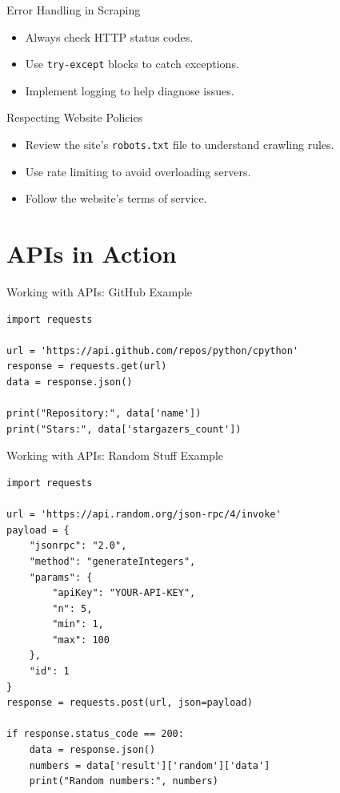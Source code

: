 \documentclass[10pt]{beamer}
\begin{document}
\begin{frame}[fragile]{Error Handling in Scraping}
    \begin{itemize}
        \item Always check HTTP status codes.
        \item Use \texttt{try-except} blocks to catch exceptions.
        \item Implement logging to help diagnose issues.
    \end{itemize}
\end{frame}

\begin{frame}[fragile]{Respecting Website Policies}
    \begin{itemize}
        \item Review the site's \texttt{robots.txt} file to understand crawling rules.
        \item Use rate limiting to avoid overloading servers.
        \item Follow the website's terms of service.
    \end{itemize}
\end{frame}

\section{APIs in Action}
\begin{frame}[fragile]{Working with APIs: GitHub Example}
    \begin{verbatim}
import requests

url = 'https://api.github.com/repos/python/cpython'
response = requests.get(url)
data = response.json()

print("Repository:", data['name'])
print("Stars:", data['stargazers_count'])
    \end{verbatim}
\end{frame}

\begin{frame}[fragile]{Working with APIs: Random Stuff Example}
    \begin{verbatim}
import requests

url = 'https://api.random.org/json-rpc/4/invoke'
payload = {
    "jsonrpc": "2.0",
    "method": "generateIntegers",
    "params": {
        "apiKey": "YOUR-API-KEY",
        "n": 5,
        "min": 1,
        "max": 100
    },
    "id": 1
}
response = requests.post(url, json=payload)

if response.status_code == 200:
    data = response.json()
    numbers = data['result']['random']['data']
    print("Random numbers:", numbers)
    \end{verbatim}
\end{frame}
\end{document}
